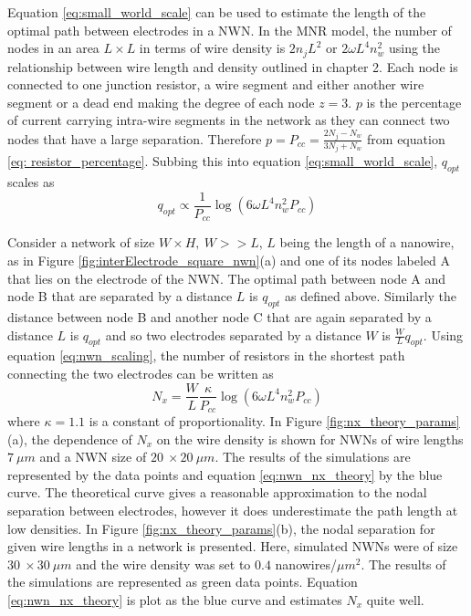 Equation \ref{eq:small_world_scale} can be used to estimate the length of the optimal path between electrodes in a NWN. In the MNR model, the number of nodes in an area $L\times L$ in terms of wire density is $2 n_j L^2$ or $2 \omega L^4 n_w^2$ using the relationship between wire length and density outlined in chapter 2\cite{ocallaco2016}. Each node is connected to one junction resistor, a wire segment and either another wire segment or a dead end making the degree of each node $z = 3$. $p$ is the percentage of current carrying intra-wire segments in the network as they can connect two nodes that have a large separation. Therefore $p = P_{cc} = \frac{2 N_j - N_w}{3N_j + N_w}$ from equation \ref{eq: resistor_percentage}. Subbing this into equation \ref{eq:small_world_scale}, $q_{opt}$ scales as
\begin{equation}
q_{opt} \propto \frac{1}{P_{cc}} \log (6 \omega L^4 n_w^2 P_{cc})
\label{eq:nwn_scaling}
\end{equation}

Consider a network of size $W \times H, ~ W>>L$, $L$ being the length of a nanowire, as in Figure \ref{fig:interElectrode_square_nwn}(a) and one of its nodes labeled A that lies on the electrode of the NWN. The optimal path between node A and node B that are separated by a distance $L$ is $q_{opt}$ as defined above. Similarly the distance between node B and another node C that are again separated by a distance $L$ is $q_{opt}$ and so two electrodes separated by a distance $W$ is $\frac{W}{L} q_{opt}$. Using equation \ref{eq:nwn_scaling}, the number of resistors in the shortest path connecting the two electrodes can be written as\cite{ocallaco2016}
\begin{equation}
N_x =\frac{W}{L} \frac{\kappa}{P_{cc}} \log (6 \omega L^4 n_w^2 P_{cc})
\label{eq:nwn_nx_theory}
\end{equation}
where $\kappa = 1.1$ is a constant of proportionality. In Figure \ref{fig:nx_theory_params}(a), the dependence of $N_x$ on the wire density is shown for NWNs of wire lengths $7~\mu m$ and a NWN size of $20~ \times 20~\mu m$. The results of the simulations are represented by the data points and equation \ref{eq:nwn_nx_theory} by the blue curve. The theoretical curve gives a reasonable approximation to the nodal separation between electrodes, however it does underestimate the path length at low densities. In Figure \ref{fig:nx_theory_params}(b), the nodal separation for given wire lengths in a network is presented. Here, simulated NWNs were of size $30~ \times 30~\mu m$ and the wire density was set to $0.4$ nanowires/$\mu m^2$. The results of the simulations are represented as green data points. Equation \ref{eq:nwn_nx_theory} is plot as the blue curve and estimates $N_x$ quite well. 
 
